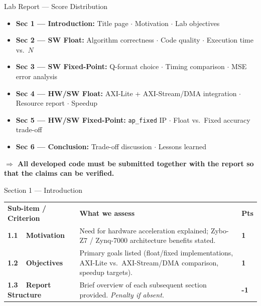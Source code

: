 \documentclass[10pt,aspectratio=169]{beamer}
\begin{document}
\begin{frame}{Lab Report --- Score Distribution}
\vspace{0.15cm}
{\small\color{TxtMd}
\begin{itemize}\setlength{\itemsep}{1pt}
  \item \textbf{\color{Navy!60}Sec 1 — Introduction:} Title page $\cdot$ Motivation $\cdot$ Lab objectives
  \item \textbf{\color{C2}Sec 2 — SW Float:} Algorithm correctness $\cdot$ Code quality $\cdot$ Execution time vs.\ $N$
  \item \textbf{\color{C3}Sec 3 — SW Fixed-Point:} Q-format choice $\cdot$ Timing comparison $\cdot$ MSE error analysis
  \item \textbf{\color{C4}Sec 4 — HW/SW Float:} AXI-Lite + AXI-Stream/DMA integration $\cdot$ Resource report $\cdot$ Speedup
  \item \textbf{\color{C5}Sec 5 — HW/SW Fixed-Point:} \texttt{ap\_fixed} IP $\cdot$ Float vs.\ Fixed accuracy trade-off
  \item \textbf{\color{C6}Sec 6 — Conclusion:} Trade-off discussion $\cdot$ Lessons learned
\end{itemize}
\vspace{0.05cm}


\vspace{0.1cm}
{\small\color{Orange}\textbf{$\Rightarrow$ All developed code must be submitted together with the report so that the claims can be verified.}}}
\end{frame}


\begin{frame}{Section 1 --- Introduction}
\setlength{\extrarowheight}{2pt}\setlength{\tabcolsep}{4pt}
\begin{tabular}{m{3.8cm}m{8.8cm}>{\raggedleft\arraybackslash}m{1.4cm}}
\rowcolor{Navy!70}
\textbf{\color{white}Sub-item / Criterion} &
\textbf{\color{white}What we assess} &
\textbf{\color{white}Pts} \tabularnewline
\textbf{1.1\ \ Motivation} &
  {\color{TxtMd}Need for hardware acceleration explained; Zybo-Z7 / Zynq-7000 architecture benefits stated.} &
  \textbf{\color{Navy!80}1} \tabularnewline
\textbf{1.2\ \ Objectives} &
  {\color{TxtMd}Primary goals listed (float/fixed implementations, AXI-Lite vs.\ AXI-Stream/DMA comparison, speedup targets).} &
  \textbf{\color{Navy!80}1} \tabularnewline
\textbf{1.3\ \ Report Structure} &
  {\color{TxtMd}Brief overview of each subsequent section provided. \textit{Penalty if absent.}} &
  \textbf{\color{Orange}-1} \tabularnewline
\end{tabular}
\end{frame}
\end{document}
